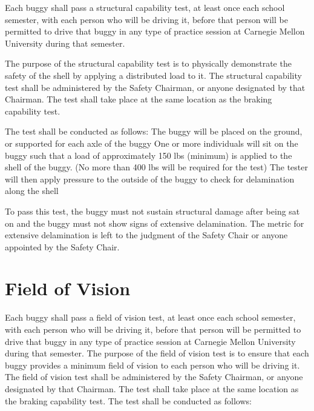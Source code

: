 	Each buggy shall pass a structural capability test, at least once each school semester, with each person who will be driving it, before that person will be permitted to drive that buggy in any type of practice session at Carnegie Mellon University during that semester. 

	The purpose of the structural capability test is to physically demonstrate the safety of the shell by applying a distributed load to it. The structural capability test shall be administered by the Safety Chairman, or anyone designated by that Chairman. The test shall take place at the same location as the braking capability test. 

	The test shall be conducted as follows: 
	The buggy will be placed on the ground, or supported for each axle of the buggy 
	One or more individuals will sit on the buggy such that a load of approximately 150 lbs (minimum) is applied to the shell of the buggy. (No more than 400 lbs will be required for the test)
	The tester will then apply pressure to the outside of the buggy to check for delamination along the shell

	To pass this test, the buggy must not sustain structural damage after being sat on and the buggy must not show signs of extensive delamination. The metric for extensive delamination is left to the judgment of the Safety Chair or anyone appointed by the Safety Chair.

\section{Field of Vision}

	Each buggy shall pass a field of vision test, at least once each school semester, with each person who will be driving it, before that person will be permitted to drive that buggy in any type of practice session at Carnegie Mellon University during that semester. The purpose of the field of vision test is to ensure that each buggy provides a minimum field of vision to each person who will be driving it. The field of vision test shall be administered by the Safety Chairman, or anyone designated by that Chairman. The test shall take place at the same location as the braking capability test.
	The test shall be conducted as follows:

